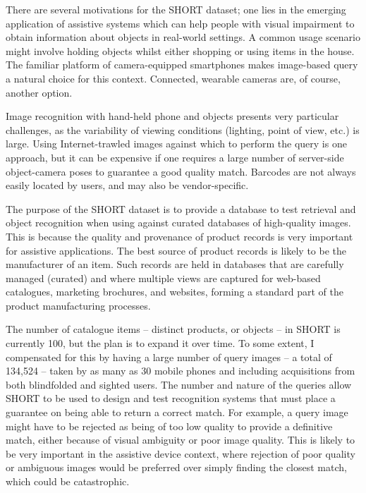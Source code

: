 There are several motivations for the SHORT dataset; one lies in the emerging application of assistive systems which can help people with visual impairment to obtain information about objects in real-world settings. A common usage scenario might involve holding objects whilst either shopping or using items in the house. The familiar platform of camera-equipped smartphones makes image-based query a natural choice for this context. Connected, wearable cameras are, of course, another option.

Image recognition with hand-held phone and objects presents very particular challenges, as the variability of viewing conditions (lighting, point of view, etc.) is large. Using Internet-trawled images against which to perform the query is one approach, but it can be expensive if one requires a large number of server-side object-camera poses to guarantee a good quality match. Barcodes are not always easily located by users, and may also be vendor-specific. 


The purpose of the SHORT dataset is to provide a database to test retrieval and object recognition when using against curated databases of high-quality images. This is because the quality and provenance of product records is very important for assistive applications. The best source of product records is likely to be the manufacturer of an item. Such records are held in databases that are carefully managed (curated) and where multiple views are captured for web-based catalogues, marketing brochures, and websites, forming a standard part of the product manufacturing processes.



The number of catalogue items -- distinct products, or objects -- in SHORT is currently 100, but the plan is to expand it over time. To some extent, I compensated for this by having a large number of query images -- a total of 134,524 -- taken by as many as 30 mobile phones and including acquisitions from both blindfolded and sighted users. The number and nature of the queries allow SHORT to be used to design and test recognition systems that must place a guarantee on being able to return a correct match. For example, a query image might have to be rejected as being of too low quality to provide a definitive match, either because of visual ambiguity or poor image quality. This is likely to be very important in the assistive device context, where rejection of poor quality or ambiguous images would be preferred over simply finding the closest match, which could be catastrophic.


